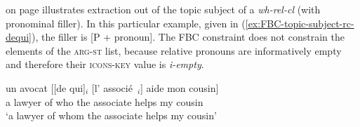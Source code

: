  on page \pageref{fig:FBC-topic-subject-rc-dequi} illustrates extraction out of the topic subject of a \emph{wh-rel-cl} (with pronominal filler). In this particular example, given in (\ref{ex:FBC-topic-subject-rc-dequi}), the filler is [P + pronoun]. The FBC constraint does not constrain the elements of the \textsc{arg-st} list, because relative pronouns are informatively empty \citep[112]{Song.2017} and therefore their \textsc{icons-key} value is \emph{i-empty}.

\ea
\gll un avocat [[de qui]$_i$ [l' associé~\trace{}$_i$] aide mon cousin]\\
a lawyer \ssbar{}of who \sbar{}the associate helps my cousin\\
\glt `a lawyer of whom the associate helps my cousin'
\label{ex:FBC-topic-subject-rc-dequi}
\z 

